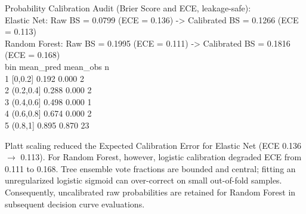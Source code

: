 \documentclass[11pt,oneside]{book}
\begin{document}
\begin{routput}
Probability Calibration Audit (Brier Score and ECE, leakage-safe):\\
\hspace*{2em}Elastic Net:   Raw BS = 0.0799 (ECE = 0.136) -> Calibrated BS = 0.1266 (ECE = 0.113)\\
\hspace*{2em}Random Forest: Raw BS = 0.1995 (ECE = 0.111) -> Calibrated BS = 0.1816 (ECE = 0.168)\\
\hspace*{1em}bin       mean\_pred mean\_obs     n\\
1 [0,0.2]       0.192    0.000     2\\
2 (0.2,0.4]     0.288    0.000     2\\
3 (0.4,0.6]     0.498    0.000     1\\
4 (0.6,0.8]     0.674    0.000     2\\
5 (0.8,1]       0.895    0.870    23
\end{routput}

Platt scaling reduced the Expected Calibration Error for Elastic Net (ECE 0.136 $\to$ 0.113). For Random Forest, however, logistic calibration degraded ECE from 0.111 to 0.168. Tree ensemble vote fractions are bounded and central; fitting an unregularized logistic sigmoid can over-correct on small out-of-fold samples. Consequently, uncalibrated raw probabilities are retained for Random Forest in subsequent decision curve evaluations.
\end{document}
